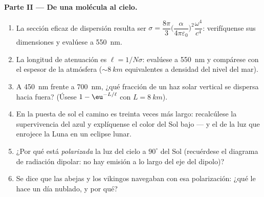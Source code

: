 \begin{problem}
\medskip\noindent\textbf{Parte II --- De una molécula al
cielo.}
\begin{enumerate}[resume]
  \item La sección eficaz de dispersión resulta ser $\sigma =
        \dfrac{8\pi}{3}\Big(\dfrac{\alpha}{4\pi\varepsilon_0}
        \Big)^2\dfrac{\omega^4}{c^4}$: verifíquense sus dimensiones y
        evalúese a \qty{550}{nm}.
  \item La longitud de atenuación es $\ell = 1/N\sigma$: evalúese
        a \qty{550}{nm} y compárese con el espesor de la
        atmósfera ($\sim\qty{8}{km}$ equivalentes a densidad del nivel
        del mar).
  \item A \qty{450}{nm} frente a \qty{700}{nm}, ¿qué fracción de un haz
        solar vertical se dispersa hacia fuera? (Úsese $1 -
        \eu^{-L/\ell}$ con $L = \qty{8}{km}$).
  \item En la puesta de sol el camino es treinta veces más largo: recalcúlese
        la supervivencia del azul y explíquense el color del Sol bajo ---
        y el de la luz que enrojece la Luna en un eclipse
        lunar.
  \item ¿Por qué está \emph{polarizada} la luz del cielo a $90^\circ$
        del Sol (recuérdese el diagrama de radiación dipolar: no hay
        emisión a lo largo del eje del dipolo)?
  \item Se dice que las abejas y los vikingos navegaban con esa
        polarización: ¿qué le hace un día nublado, y por qué?
\end{enumerate}


\end{problem}
